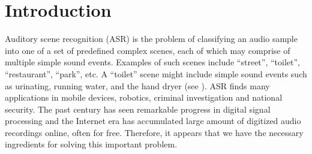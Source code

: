 \section{Introduction}
\label{sec:intro}

Auditory scene recognition (ASR) \cite{5745009} is the problem of 
classifying an audio sample into one of a set of predefined complex
scenes, each of which may comprise of multiple simple sound events. 
Examples of such scenes include ``street'', ``toilet'', ``restaurant'', 
``park'', etc. A ``toilet'' scene might include simple sound events such as 
urinating, running water, and the hand dryer (see ).
ASR finds many applications in mobile devices, robotics, criminal 
investigation and national security. 
%
The past century has seen remarkable progress in digital signal processing 
and the Internet era has accumulated large amount of digitized audio 
recordings online, often for free.
Therefore, it appears that we have the necessary ingredients
for solving this important problem. 

